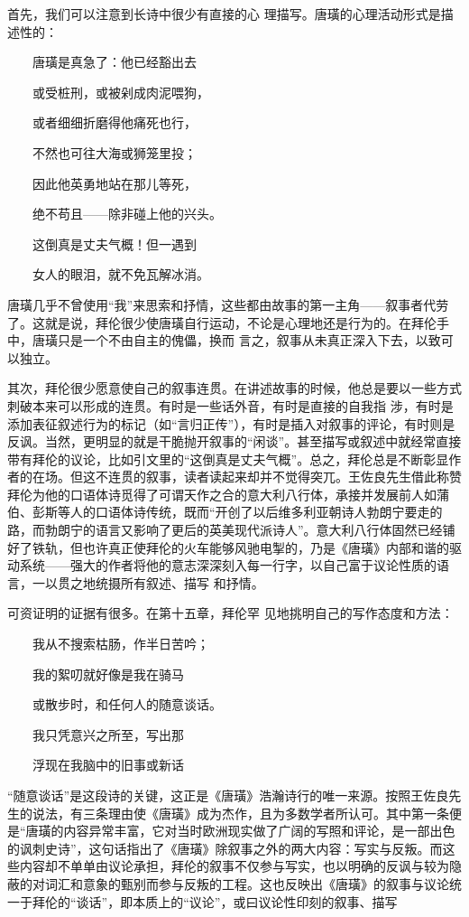 \documentclass{article}
\begin{document}
首先，我们可以注意到长诗中很少有直接的心
理描写。唐璜的心理活动形式是描述性的： 


　　唐璜是真急了：他已经豁出去 


　　或受桩刑，或被剁成肉泥喂狗， 

\newpage


　　或者细细折磨得他痛死也行， 


　　不然也可往大海或狮笼里投； 


　　因此他英勇地站在那儿等死， 


　　绝不苟且——除非碰上他的兴头。 


　　这倒真是丈夫气概！但一遇到 


　　女人的眼泪，就不免瓦解冰消。 

唐璜几乎不曾使用“我”来思索和抒情，这些都由故事的第一主角——叙事者代劳了。这就是说，拜伦很少使唐璜自行运动，不论是心理地还是行为的。在拜伦手中，唐璜只是一个不由自主的傀儡，换而
言之，叙事从未真正深入下去，以致可以独立。 

其次，拜伦很少愿意使自己的叙事连贯。在讲述故事的时候，他总是要以一些方式刺破本来可以形成的连贯。有时是一些话外音，有时是直接的自我指
\newpage
涉，有时是添加表征叙述行为的标记（如“言归正传”），有时是插入对叙事的评论，有时则是反讽。当然，更明显的就是干脆抛开叙事的“闲谈”。甚至描写或叙述中就经常直接带有拜伦的议论，比如引文里的“这倒真是丈夫气概”。总之，拜伦总是不断彰显作者的在场。但这不连贯的叙事，读者读起来却并不觉得突兀。王佐良先生借此称赞拜伦为他的口语体诗觅得了可谓天作之合的意大利八行体，承接并发展前人如蒲伯、彭斯等人的口语体诗传统，既而“开创了以后维多利亚朝诗人勃朗宁要走的路，而勃朗宁的语言又影响了更后的英美现代派诗人”。意大利八行体固然已经铺好了铁轨，但也许真正使拜伦的火车能够风驰电掣的，乃是《唐璜》内部和谐的驱动系统——强大的作者将他的意志深深刻入每一行字，以自己富于议论性质的语言，一以贯之地统摄所有叙述、描写
和抒情。 

可资证明的证据有很多。在第十五章，拜伦罕
见地挑明自己的写作态度和方法： 


\newpage

　　我从不搜索枯肠，作半日苦吟； 


　　我的絮叨就好像是我在骑马 


　　或散步时，和任何人的随意谈话。 


　　我只凭意兴之所至，写出那 


　　浮现在我脑中的旧事或新话 

“随意谈话”是这段诗的关键，这正是《唐璜》浩瀚诗行的唯一来源。按照王佐良先生的说法，有三条理由使《唐璜》成为杰作，且为多数学者所认可。其中第一条便是“唐璜的内容异常丰富，它对当时欧洲现实做了广阔的写照和评论，是一部出色的讽刺史诗”，这句话指出了《唐璜》除叙事之外的两大内容：写实与反叛。而这些内容却不单单由议论承担，拜伦的叙事不仅参与写实，也以明确的反讽与较为隐蔽的对词汇和意象的甄别而参与反叛的工程。这也反映出《唐璜》的叙事与议论统一于拜伦的“谈话”，即本质上的“议论”，或曰议论性印刻的叙事、描写
\end{document}

